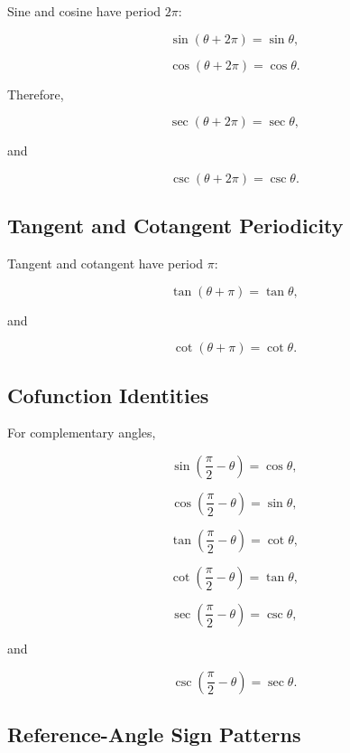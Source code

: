 Sine and cosine have period \(2\pi\):

\[
\boxed{
\sin(\theta+2\pi)
=
\sin\theta,
}
\]

\[
\boxed{
\cos(\theta+2\pi)
=
\cos\theta.
}
\]

Therefore,

\[
\boxed{
\sec(\theta+2\pi)
=
\sec\theta,
}
\]

and

\[
\boxed{
\csc(\theta+2\pi)
=
\csc\theta.
}
\]

\subsection{Tangent and Cotangent Periodicity}
\label{subsec:tangent-cotangent-period}

Tangent and cotangent have period \(\pi\):

\[
\boxed{
\tan(\theta+\pi)
=
\tan\theta,
}
\]

and

\[
\boxed{
\cot(\theta+\pi)
=
\cot\theta.
}
\]

\subsection{Cofunction Identities}
\label{subsec:cofunction-identities-reference}

For complementary angles,

\[
\boxed{
\sin\left(
\frac{\pi}{2}-\theta
\right)
=
\cos\theta,
}
\]

\[
\boxed{
\cos\left(
\frac{\pi}{2}-\theta
\right)
=
\sin\theta,
}
\]

\[
\boxed{
\tan\left(
\frac{\pi}{2}-\theta
\right)
=
\cot\theta,
}
\]

\[
\boxed{
\cot\left(
\frac{\pi}{2}-\theta
\right)
=
\tan\theta,
}
\]

\[
\boxed{
\sec\left(
\frac{\pi}{2}-\theta
\right)
=
\csc\theta,
}
\]

and

\[
\boxed{
\csc\left(
\frac{\pi}{2}-\theta
\right)
=
\sec\theta.
}
\]

\subsection{Reference-Angle Sign Patterns}
\label{subsec:reference-angle-sign-patterns}

